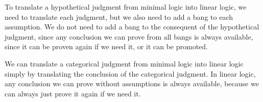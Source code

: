 \documentclass[../../../main.tex]{subfiles}
\begin{document}
To translate a hypothetical judgment from minimal logic into linear logic, we need to translate each judgment, but we also need to add a bang to each assumption. We do not need to add a bang to the consequent of the hypothetical judgment, since any conclusion we can prove from all bangs is always available, since it can be proven again if we need it, or it can be promoted. 

We can translate a categorical judgment from minimal logic into linear logic simply by translating the conclusion of the categorical judgment. In linear logic, any conclusion we can prove without assumptions is always available, because we can always just prove it again if we need it.
\end{document}
